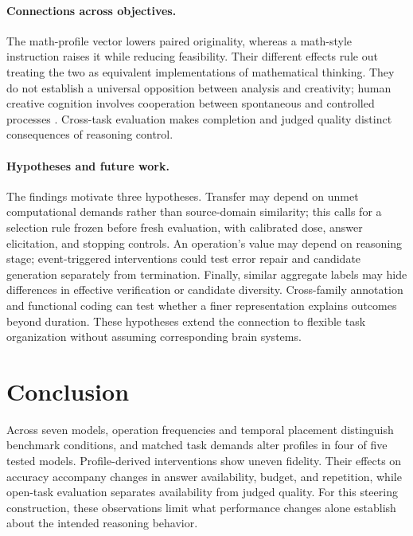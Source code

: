 \paragraph{Connections across objectives.}
The math-profile vector lowers paired originality, whereas a math-style instruction raises it while reducing feasibility. Their different effects rule out treating the two as equivalent implementations of mathematical thinking. They do not establish a universal opposition between analysis and creativity; human creative cognition involves cooperation between spontaneous and controlled processes \citep{beaty2015creative}. Cross-task evaluation makes completion and judged quality distinct consequences of reasoning control.

\paragraph{Hypotheses and future work.}
The findings motivate three hypotheses. Transfer may depend on unmet computational demands rather than source-domain similarity; this calls for a selection rule frozen before fresh evaluation, with calibrated dose, answer elicitation, and stopping controls. An operation's value may depend on reasoning stage; event-triggered interventions could test error repair and candidate generation separately from termination. Finally, similar aggregate labels may hide differences in effective verification or candidate diversity. Cross-family annotation and functional coding can test whether a finer representation explains outcomes beyond duration. These hypotheses extend the connection to flexible task organization without assuming corresponding brain systems.

\section{Conclusion}
Across seven models, operation frequencies and temporal placement distinguish benchmark conditions, and matched task demands alter profiles in four of five tested models. Profile-derived interventions show uneven fidelity. Their effects on accuracy accompany changes in answer availability, budget, and repetition, while open-task evaluation separates availability from judged quality. For this steering construction, these observations limit what performance changes alone establish about the intended reasoning behavior.
